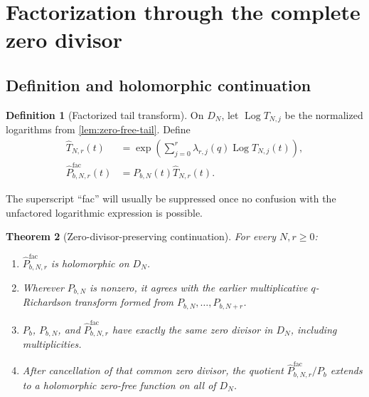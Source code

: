 \documentclass[11pt,oneside]{article}
\numberwithin{equation}{section}
\theoremstyle{frontier}
\newtheorem{theorem}{Theorem}[section]
\theoremstyle{definition}
\newtheorem{definition}[theorem]{Definition}
\theoremstyle{remark}
\newcommand{\Log}{\operatorname{Log}}
\begin{document}
\section{Factorization through the complete zero divisor}\label{sec:factorized}

\subsection{Definition and holomorphic continuation}

\begin{definition}[Factorized tail transform]\label{def:factorized}
On $D_N$, let $\Log T_{N,j}$ be the normalized logarithms from
\cref{lem:zero-free-tail}.  Define
\begin{align}
 \widehat T_{N,r}(t)
   &=\exp\!\left(\sum_{j=0}^{r}\lambda_{r,j}(q)\Log T_{N,j}(t)\right),
 \label{eq:hat-tail}\\
 \widehat P^{\mathrm{fac}}_{b,N,r}(t)
   &=P_{b,N}(t)\widehat T_{N,r}(t).
 \label{eq:hat-factorized}
\end{align}
\end{definition}

The superscript ``fac'' will usually be suppressed once no confusion with the unfactored
logarithmic expression is possible.

\begin{theorem}[Zero-divisor-preserving continuation]\label{thm:zero-preserving}
For every $N,r\ge0$:
\begin{enumerate}
\item $\widehat P^{\mathrm{fac}}_{b,N,r}$ is holomorphic on $D_N$.
\item Wherever $P_{b,N}$ is nonzero, it agrees with the earlier multiplicative
      $q$-Richardson transform formed from $P_{b,N},\ldots,P_{b,N+r}$.
\item $P_b$, $P_{b,N}$, and $\widehat P^{\mathrm{fac}}_{b,N,r}$ have exactly the same zero
      divisor in $D_N$, including multiplicities.
\item After cancellation of that common zero divisor, the quotient
      $\widehat P^{\mathrm{fac}}_{b,N,r}/P_b$ extends to a holomorphic zero-free function on
      all of $D_N$.
\end{enumerate}
\end{theorem}
\end{document}
